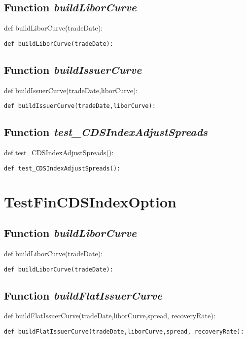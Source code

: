 \documentclass[twoside,11pt]{book}
\begin{document}
\subsection{Function {\it buildLiborCurve}}
def buildLiborCurve(tradeDate):

\begin{lstlisting}
def buildLiborCurve(tradeDate):
\end{lstlisting}

\subsection{Function {\it buildIssuerCurve}}
def buildIssuerCurve(tradeDate,liborCurve):

\begin{lstlisting}
def buildIssuerCurve(tradeDate,liborCurve):
\end{lstlisting}

\subsection{Function {\it test\_CDSIndexAdjustSpreads}}
def test\_CDSIndexAdjustSpreads():

\begin{lstlisting}
def test_CDSIndexAdjustSpreads():
\end{lstlisting}


\newpage
\section{TestFinCDSIndexOption}

\subsection{Function {\it buildLiborCurve}}
def buildLiborCurve(tradeDate):

\begin{lstlisting}
def buildLiborCurve(tradeDate):
\end{lstlisting}

\subsection{Function {\it buildFlatIssuerCurve}}
def buildFlatIssuerCurve(tradeDate,liborCurve,spread, recoveryRate):

\begin{lstlisting}
def buildFlatIssuerCurve(tradeDate,liborCurve,spread, recoveryRate):
\end{lstlisting}
\end{document}
